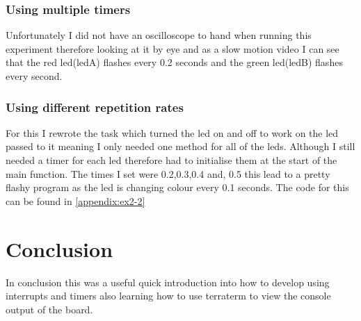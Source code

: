 \documentclass[a4paper,12pt]{scrartcl}
\begin{document}
{{			\subsubsection{Using multiple timers}
			{
				Unfortunately I did not have an oscilloscope to hand when running this experiment therefore looking at it by eye and as a slow motion video I can see that the red led(ledA) flashes every 0.2 seconds and the green led(ledB) flashes every second. 
			}
			\subsubsection{Using different repetition rates}
			{
				For this I rewrote the task which turned the led on and off to work on the led passed to it meaning I only needed one method for all of the leds. Although I still needed a timer for each led therefore had to initialise them at the start of the main function. The times I set were 0.2,0.3,0.4 and, 0.5 this lead to a  pretty flashy program as the led is changing colour every 0.1 seconds. The code for this can be found in \cref{appendix:ex2-2}
			}
		}
	}

	\section{Conclusion}
	{
		In conclusion this was a useful quick introduction into how to develop using interrupts and timers also learning how to use terraterm to view the console output of the board.
	}
	
	\newpage
	
	\printbibliography[heading=bibintoc,title=References]
\end{document}
